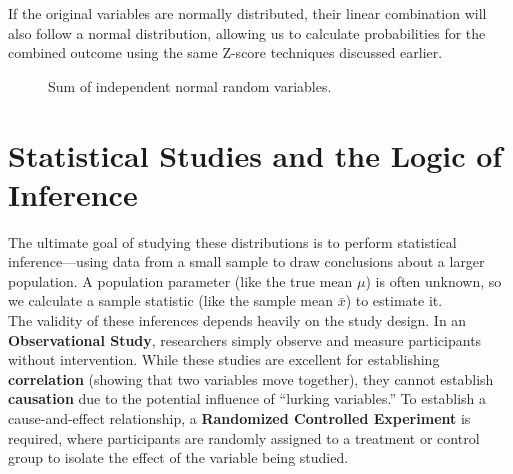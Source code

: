 \documentclass[12pt]{scrartcl}
\begin{document}
If the original variables are normally distributed, their linear combination will also follow a normal distribution, allowing us to calculate probabilities for the combined outcome using the same Z-score techniques discussed earlier.

\begin{figure}[H]
	\centering
	\caption{Sum of independent normal random variables.}
\end{figure}

\section{Statistical Studies and the Logic of Inference}

The ultimate goal of studying these distributions is to perform statistical inference---using data from a small sample to draw conclusions about a larger population. A population parameter (like the true mean $\mu$) is often unknown, so we calculate a sample statistic (like the sample mean $\bar{x}$) to estimate it. \\

The validity of these inferences depends heavily on the study design. In an \textbf{Observational Study}, researchers simply observe and measure participants without intervention. While these studies are excellent for establishing \textbf{correlation} (showing that two variables move together), they cannot establish \textbf{causation} due to the potential influence of ``lurking variables.'' To establish a cause-and-effect relationship, a \textbf{Randomized Controlled Experiment} is required, where participants are randomly assigned to a treatment or control group to isolate the effect of the variable being studied.
\end{document}
